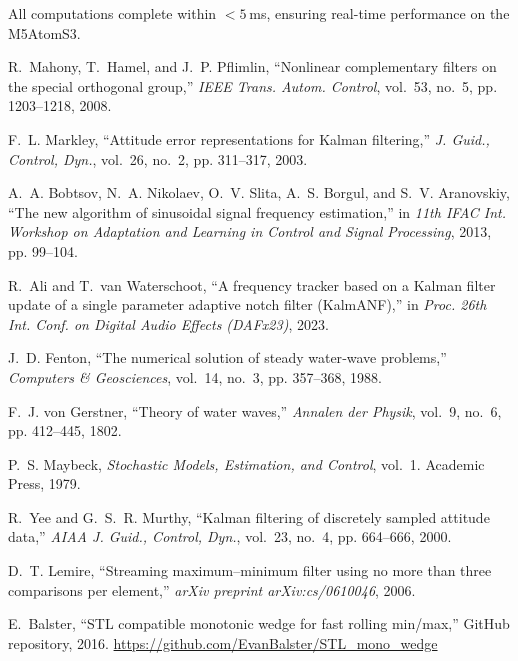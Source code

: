 \documentclass[12pt,letterpaper]{article}
\begin{document}
All computations complete within \(<5\) ms, ensuring real-time performance on the M5AtomS3.

\begin{thebibliography}{10}

R.~Mahony, T.~Hamel, and J.~P. Pflimlin, “Nonlinear complementary filters on the special orthogonal group,” \emph{IEEE Trans. Autom. Control}, vol.~53, no.~5, pp. 1203–1218, 2008.

F.~L. Markley, “Attitude error representations for Kalman filtering,” \emph{J. Guid., Control, Dyn.}, vol.~26, no.~2, pp. 311–317, 2003.

A.~A. Bobtsov, N.~A. Nikolaev, O.~V. Slita, A.~S. Borgul, and S.~V. Aranovskiy, “The new algorithm of sinusoidal signal frequency estimation,” in \emph{11th IFAC Int. Workshop on Adaptation and Learning in Control and Signal Processing}, 2013, pp. 99–104.

R.~Ali and T.~van Waterschoot, “A frequency tracker based on a Kalman filter update of a single parameter adaptive notch filter (KalmANF),” in \emph{Proc. 26th Int. Conf. on Digital Audio Effects (DAFx23)}, 2023.

J.~D. Fenton, “The numerical solution of steady water‐wave problems,” \emph{Computers \& Geosciences}, vol.~14, no.~3, pp. 357–368, 1988.

F.~J. von Gerstner, “Theory of water waves,” \emph{Annalen der Physik}, vol.~9, no.~6, pp. 412–445, 1802.

P.~S. Maybeck, \emph{Stochastic Models, Estimation, and Control}, vol.~1. Academic Press, 1979.

R.~Yee and G.~S.~R. Murthy, “Kalman filtering of discretely sampled attitude data,” \emph{AIAA J. Guid., Control, Dyn.}, vol.~23, no.~4, pp. 664–666, 2000.

D.~T. Lemire, “Streaming maximum–minimum filter using no more than three comparisons per element,” \emph{arXiv preprint arXiv:cs/0610046}, 2006.

E.~Balster, “STL compatible monotonic wedge for fast rolling min/max,” GitHub repository, 2016. \url{https://github.com/EvanBalster/STL_mono_wedge}

\end{thebibliography}
\end{document}
